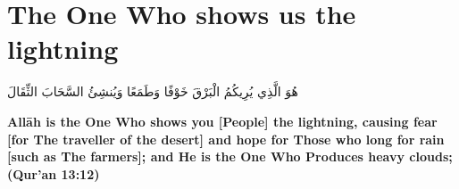 \chapter{The One Who shows us the lightning}
\begin{center}
    {\Huge    
        \begin{Arabic}
            هُوَ الَّذِي يُرِيكُمُ الْبَرْقَ خَوْفًا وَطَمَعًا وَيُنشِئُ السَّحَابَ الثِّقَالَ
        \end{Arabic}
    }    
\end{center}
\vspace*{\fill}
\vspace{3cm}
\begin{center}
    \large \textbf{Allāh is the One Who shows you [People] the lightning, causing fear [for The traveller of the desert] and hope for Those who long for rain [such as The farmers]; and He is the One Who Produces heavy clouds; (Qur'an 13:12)}
\end{center}
